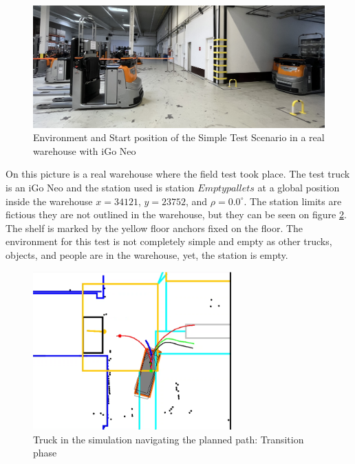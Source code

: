 \begin{figure}[H]
    \begin{center}
        \includegraphics[width=5in]{images/Chap3/Start_Sc1.jpg} %
        \caption{Environment and Start position of the Simple Test Scenario in a real warehouse
        with iGo Neo}
        \label{OptResult11}
        \end{center}    
\end{figure}

On this picture is a real warehouse where the field test took place.
The test truck is an iGo Neo and the station used is station \(Empty pallets\) at a 
global position inside the warehouse \(x = 34121\), \(y = 23752\), and \(\rho = 0.0^\circ\).
The station limits are fictious they are not outlined in the warehouse, 
but they can be seen on figure \ref{OptResult10}.
The shelf is marked by the yellow floor anchors fixed on the floor.
The environment for this test is not completely simple and empty as 
other trucks, objects, and people are in the warehouse, yet, the station is 
empty. 

\begin{figure}[H]
    \begin{center}
        \includegraphics[width=3in]{images/Chap3/Test1_transition.png} %
        \caption{Truck in the simulation navigating the planned path: Transition phase}
        \label{OptResult10}
        \end{center}    
\end{figure}


